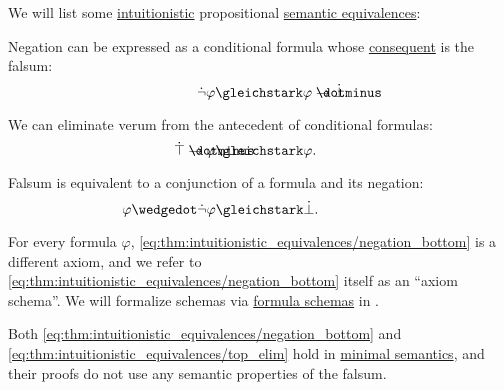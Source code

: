 \begin{proposition}\label{thm:intuitionistic_equivalences}
  We will list some \hyperref[def:propositional_semantics]{intuitionistic} propositional \hyperref[def:semantic_equivalence]{semantic equivalences}:
  \begin{thmenum}
     Negation can be expressed as a conditional formula whose \hyperref[def:conditional_formula/consequent]{consequent} is the falsum:
    \begin{equation}\label{eq:thm:intuitionistic_equivalences/negation_bottom}
      \mathllap{\synneg \varphi} \gleichstark \mathrlap{\varphi \synimplies \synbot.}
    \end{equation}

     We can eliminate verum from the antecedent of conditional formulas:
    \begin{equation}\label{eq:thm:intuitionistic_equivalences/top_elim}
      \mathllap{\syntop \synimplies \varphi} \gleichstark \mathrlap{\varphi.}
    \end{equation}

     Falsum is equivalent to a conjunction of a formula and its negation:
    \begin{equation}\label{eq:thm:intuitionistic_equivalences/contradiction}
      \mathllap{\varphi \synwedge \synneg \varphi} \gleichstark \mathrlap{\synbot.}
    \end{equation}
  \end{thmenum}
\end{proposition}
\begin{comments}
  \item For every formula \( \varphi \), \eqref{eq:thm:intuitionistic_equivalences/negation_bottom} is a different axiom, and we refer to \eqref{eq:thm:intuitionistic_equivalences/negation_bottom} itself as an \enquote{axiom schema}. We will formalize schemas via \hyperref[def:propositional_formula_schema]{formula schemas} in .
  \item Both \eqref{eq:thm:intuitionistic_equivalences/negation_bottom} and \eqref{eq:thm:intuitionistic_equivalences/top_elim} hold in \hyperref[def:minimal_propositional_semantics]{minimal semantics}, and their proofs do not use any semantic properties of the falsum.
\end{comments}
